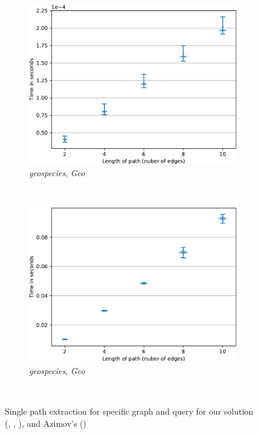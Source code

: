 \begin{figure}
     \begin{subfigure}[b]{0.24\textwidth}
         \centering
         \includegraphics[width=\textwidth]{../paper/data/CF/Matrix_CF/geo_path_matrix.pdf}
         \caption{\footnotesize \textit{geospecies}, \textit{Geo}}
         \label{fig:geo_matrix_cfpq}
     \end{subfigure}
     ~\begin{subfigure}[b]{0.24\textwidth}
         \centering
         \includegraphics[width=\textwidth]{../paper/data/CF/Tensor_path/geo_path_tensor.pdf}
         \caption{\footnotesize \textit{geospecies}, \textit{Geo}}
         \label{fig:geo_tensors_cfpq}
     \end{subfigure}\\
   \caption{Single path extraction for specific graph and query for our solution (, , ), and Azimov's ()}
\end{figure}

